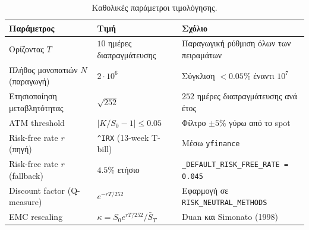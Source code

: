 \documentclass[12pt]{article}
\begin{document}
\begin{table}[h]
\centering
\small
\caption{Καθολικές παράμετροι τιμολόγησης.}
\label{tab:appA_global}
\begin{tabular}{p{4.5cm} p{4.0cm} p{5.0cm}}
\hline
Παράμετρος & Τιμή & Σχόλιο \\ \hline
Ορίζοντας $T$ & $10$ ημέρες διαπραγμάτευσης & Παραγωγική ρύθμιση όλων των πειραμάτων \\
Πλήθος μονοπατιών $N$ (παραγωγή) & $2 \cdot 10^{6}$ & Σύγκλιση $< 0.05\%$ έναντι $10^{7}$ \\
Ετησιοποίηση μεταβλητότητας & $\sqrt{252}$ & $252$ ημέρες διαπραγμάτευσης ανά έτος \\
ATM threshold & $|K/S_{0} - 1| \leq 0.05$ & Φίλτρο $\pm 5\%$ γύρω από το spot \\
Risk-free rate $r$ (πηγή) & \texttt{\textasciicircum IRX} (13-week T-bill) & Μέσω \texttt{yfinance} \\
Risk-free rate $r$ (fallback) & $4.5\%$ ετήσιο & \texttt{\_DEFAULT\_RISK\_FREE\_RATE = 0.045} \\
Discount factor (Q-measure) & $e^{-rT/252}$ & Εφαρμογή σε \texttt{RISK\_NEUTRAL\_METHODS} \\
EMC rescaling & $\kappa = S_{0} e^{rT/252} / \bar{S}_{T}$ & Duan και Simonato (1998) \\ \hline
\end{tabular}
\end{table}
\end{document}
